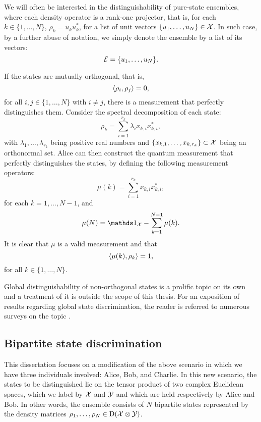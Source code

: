 We will often be interested in the distinguishability of pure-state ensembles,
where each density operator is a rank-one projector, that is, for each 
$k \in \{1, \ldots, N\}$, $\rho_{k} = u_{k}u_{k}^{\ast}$, 
for a list of unit vectors $\{u_{1}, \ldots, u_{N}\} \in \mathcal{X}$. 
In such case, by a further abuse of notation, we simply denote the ensemble by 
a list of its vectors:
\begin{equation}
  \mathcal{E} = \{u_{1}, \ldots, u_{N}\}.
\end{equation}

If the states are mutually orthogonal, that is,
\begin{equation}
\langle \rho_{i} , \rho_{j}\rangle = 0,
\end{equation}
for all $i,j \in \{1, \ldots, N\}$ with $i \neq j$, there is a measurement
that perfectly distinguishes them.
Consider the spectral decomposition of each state:
\begin{equation}
  \rho_{k} = \sum_{i=1}^{r_{k}}\lambda_{i}x_{k,i}x_{k,i}^{\ast},
\end{equation}
with $\lambda_{1}, \ldots, \lambda_{r_{k}}$ being positive real numbers
and $\{x_{k,1}, \ldots, x_{k,r_{k}}\} \subset \mathcal{X}$ being an orthonormal set.
Alice can then construct the quantum measurement that perfectly distinguishes 
the states, by defining the following measurement operators:
\begin{equation}
  \mu(k) = \sum_{i=1}^{r_{k}}x_{k,i}x_{k,i}^{\ast},
\end{equation}
for each $k = 1,\ldots,N-1$, and 
\begin{equation}
  \mu(N) = \I_{\X} - \sum_{k=1}^{N-1}\mu(k).
\end{equation}
It is clear that $\mu$ is a valid measurement and that
\begin{equation}
  \langle \mu(k) , \rho_{k}\rangle = 1,
\end{equation}
for all $k \in \{1, \ldots, N\}$. 

Global distinguishability of non-orthogonal states is a prolific topic on its own and 
a treatment of it is outside the scope of this thesis.
For an exposition of results regarding global state discrimination, 
the reader is referred to numerous surveys on the topic \cite{Chefles2000, Bergou2004}.

\subsection*{Bipartite state discrimination}
This dissertation focuses on a modification of the above scenario in which we 
have three individuals involved: Alice, Bob, and Charlie.
In this new scenario, the states to be distinguished lie on the tensor product of 
two complex Euclidean spaces, which we label by $\mathcal{X}$ and $\mathcal{Y}$ and which are 
held respectively by Alice and Bob.
In other words, the ensemble consists of $N$ bipartite states represented 
by the density matrices $\rho_{1}, \ldots, \rho_{N} \in \mathrm{D}(\mathcal{X}\otimes\mathcal{Y})$.

